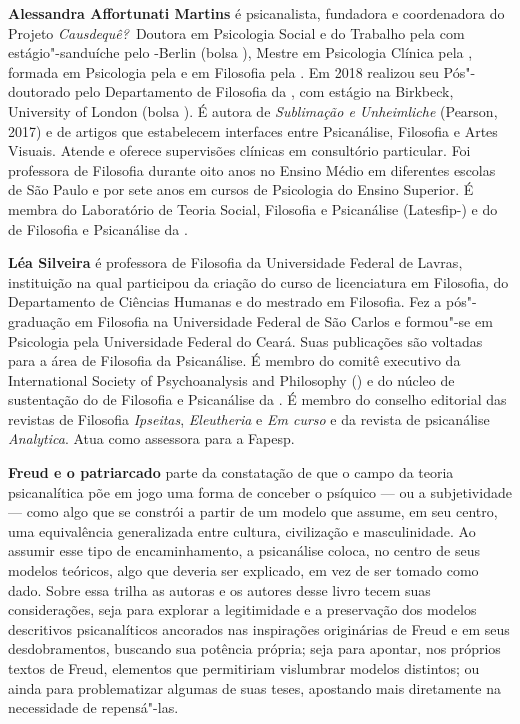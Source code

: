 \textbf{Alessandra Affortunati Martins} é psicanalista, fundadora e coordenadora do
Projeto \emph{Causdequê?} Doutora em Psicologia Social e do Trabalho pela  com
estágio"-sanduíche pelo -Berlin (bolsa ), Mestre em Psicologia Clínica pela
, formada em Psicologia pela  e em Filosofia pela . Em 2018 realizou seu Pós"-doutorado pelo Departamento de Filosofia da , com estágio na
Birkbeck, University of London (bolsa ). É autora de
\emph{Sublimação e Unheimliche} (Pearson, 2017) e de artigos que estabelecem interfaces entre
Psicanálise, Filosofia e Artes Visuais. Atende e oferece supervisões clínicas em
consultório particular. Foi professora de Filosofia durante oito anos no Ensino Médio
em diferentes escolas de São Paulo e por sete anos em cursos de Psicologia do Ensino
Superior. É membra do Laboratório de Teoria Social, Filosofia e Psicanálise (Latesfip-) e do  de Filosofia e Psicanálise da .

\textbf{Léa Silveira} é professora de Filosofia da Universidade Federal de Lavras, instituição na
qual participou da criação do curso de licenciatura em Filosofia, do Departamento de
Ciências Humanas e do mestrado em Filosofia. Fez a pós"-graduação em Filosofia na
Universidade Federal de São Carlos e formou"-se em Psicologia pela Universidade
Federal do Ceará. Suas publicações são voltadas para a área de Filosofia da Psicanálise.
É membro do comitê executivo da International Society of Psychoanalysis and
Philosophy () e do núcleo de sustentação do  de Filosofia e Psicanálise da . É membro do conselho editorial das revistas de Filosofia \emph{Ipseitas}, \emph{Eleutheria} e \emph{Em curso} e da revista de psicanálise \emph{Analytica}. Atua como assessora para a Fapesp.

\textbf{Freud e o patriarcado} parte da constatação de que o campo da teoria psicanalítica põe em jogo uma forma de conceber o psíquico --- ou a subjetividade --- como algo que se constrói a partir de um modelo que assume, em seu centro, uma equivalência generalizada entre cultura, civilização e masculinidade. Ao assumir esse tipo de encaminhamento, a psicanálise coloca, no centro de seus modelos teóricos, algo que deveria ser explicado, em vez de ser tomado como dado. Sobre essa trilha as autoras e os autores desse livro tecem suas considerações, seja para explorar a legitimidade e a preservação dos modelos descritivos psicanalíticos ancorados nas inspirações originárias de Freud e em seus desdobramentos, buscando sua potência própria; seja para apontar, nos próprios textos de Freud, elementos que permitiriam vislumbrar modelos distintos; ou ainda para problematizar algumas de suas teses, apostando mais diretamente na necessidade de repensá"-las. 







